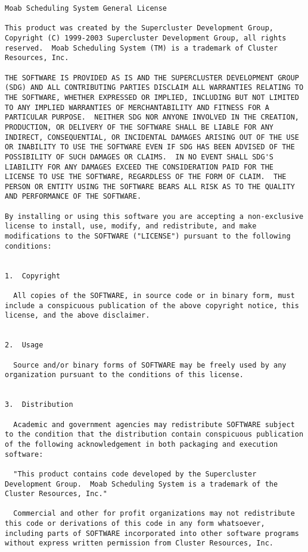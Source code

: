 \begin{verbatim}
Moab Scheduling System General License

This product was created by the Supercluster Development Group,
Copyright (C) 1999-2003 Supercluster Development Group, all rights
reserved.  Moab Scheduling System (TM) is a trademark of Cluster
Resources, Inc.

THE SOFTWARE IS PROVIDED AS IS AND THE SUPERCLUSTER DEVELOPMENT GROUP
(SDG) AND ALL CONTRIBUTING PARTIES DISCLAIM ALL WARRANTIES RELATING TO
THE SOFTWARE, WHETHER EXPRESSED OR IMPLIED, INCLUDING BUT NOT LIMITED
TO ANY IMPLIED WARRANTIES OF MERCHANTABILITY AND FITNESS FOR A
PARTICULAR PURPOSE.  NEITHER SDG NOR ANYONE INVOLVED IN THE CREATION,
PRODUCTION, OR DELIVERY OF THE SOFTWARE SHALL BE LIABLE FOR ANY
INDIRECT, CONSEQUENTIAL, OR INCIDENTAL DAMAGES ARISING OUT OF THE USE
OR INABILITY TO USE THE SOFTWARE EVEN IF SDG HAS BEEN ADVISED OF THE
POSSIBILITY OF SUCH DAMAGES OR CLAIMS.  IN NO EVENT SHALL SDG'S
LIABILITY FOR ANY DAMAGES EXCEED THE CONSIDERATION PAID FOR THE
LICENSE TO USE THE SOFTWARE, REGARDLESS OF THE FORM OF CLAIM.  THE
PERSON OR ENTITY USING THE SOFTWARE BEARS ALL RISK AS TO THE QUALITY
AND PERFORMANCE OF THE SOFTWARE.

By installing or using this software you are accepting a non-exclusive
license to install, use, modify, and redistribute, and make
modifications to the SOFTWARE ("LICENSE") pursuant to the following
conditions:


1.  Copyright

  All copies of the SOFTWARE, in source code or in binary form, must
include a conspicuous publication of the above copyright notice, this
license, and the above disclaimer.


2.  Usage

  Source and/or binary forms of SOFTWARE may be freely used by any
organization pursuant to the conditions of this license.


3.  Distribution

  Academic and government agencies may redistribute SOFTWARE subject
to the condition that the distribution contain conspicuous publication
of the following acknowledgement in both packaging and execution
software:

  "This product contains code developed by the Supercluster
Development Group.  Moab Scheduling System is a trademark of the
Cluster Resources, Inc."

  Commercial and other for profit organizations may not redistribute
this code or derivations of this code in any form whatsoever,
including parts of SOFTWARE incorporated into other software programs
without express written permission from Cluster Resources, Inc.



\end{verbatim}
